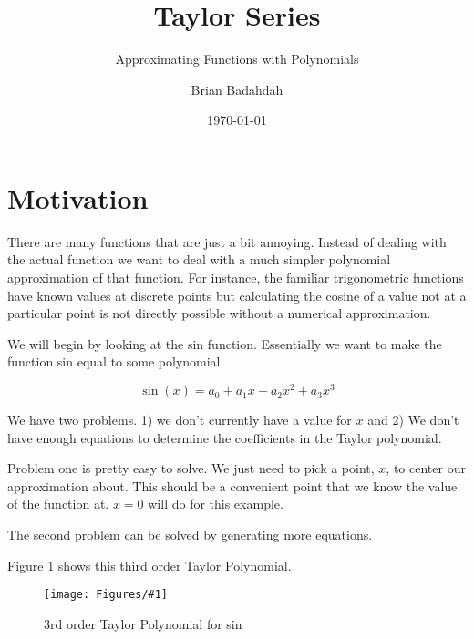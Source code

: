 \documentclass[landscape, twocolumn, 12pt]{article}
\title{Taylor Series}
\subtitle{Approximating Functions with Polynomials}
\author{Brian Badahdah}
\date{\today}
\newcommand{\fig}[2]{
\begin{figure}
  \centering
  \texttt{[image: Figures/\#1]}
  \caption{#2}
  \label{Fig:#1}
\end{figure}
}
\begin{document}
\maketitle
\section{Motivation}

There are many functions that are just a bit annoying. Instead of dealing with the actual function we want to deal with a much simpler polynomial approximation of that function. For instance, the familiar trigonometric functions have known values at discrete points but calculating the cosine of a value not at a particular point is not directly possible without a numerical approximation.

We will begin by looking at the sin function. Essentially we want to make the function sin equal to some polynomial

\begin{equation}
  \sin(x)=a_0 + a_1x+a_2x^2 + a_3x^3
\end{equation}

We have two problems. 1) we don't currently have a value for $x$ and 2) We don't have enough equations to determine the coefficients in the Taylor polynomial.

Problem one is pretty easy to solve. We just need to pick a point, $x$, to center our approximation about. This should be a convenient point that we know the value of the function at. $x=0$ will do for this example.

The second problem can be solved by generating more equations.


Figure \ref{Fig:3ordersin} shows this third order Taylor Polynomial.

\fig{3ordersin}{3rd order Taylor Polynomial for sin}






\newpage


\end{document}
